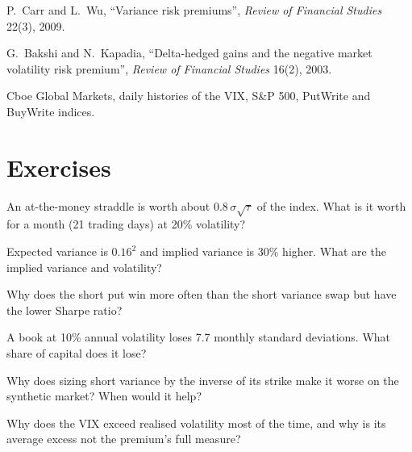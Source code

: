 \begin{omsources}
\item P.~Carr and L.~Wu, ``Variance risk premiums'', \emph{Review of Financial Studies} 22(3), 2009.
\item G.~Bakshi and N.~Kapadia, ``Delta-hedged gains and the negative market volatility risk premium'', \emph{Review of Financial Studies} 16(2), 2003.
\item Cboe Global Markets, daily histories of the VIX, S\&P 500, PutWrite and BuyWrite indices.
\end{omsources}

\section{Exercises}

\begin{exercise}[$\star$]\label{exo:s2:harvesting-the-variance-risk-premium:1}
An at-the-money straddle is worth about $0.8\,\sigma\sqrt{\tau}$ of the index. What is it worth for a month (21 trading days) at 20\% volatility?
\end{exercise}

\begin{exercise}[$\star$]\label{exo:s2:harvesting-the-variance-risk-premium:2}
Expected variance is $0.16^2$ and implied variance is 30\% higher. What are the implied variance and volatility?
\end{exercise}

\begin{exercise}[$\star$]\label{exo:s2:harvesting-the-variance-risk-premium:3}
Why does the short put win more often than the short variance swap but have the lower Sharpe ratio?
\end{exercise}

\begin{exercise}[$\star\star$]\label{exo:s2:harvesting-the-variance-risk-premium:4}
A book at 10\% annual volatility loses 7.7 monthly standard deviations. What share of capital does it lose?
\end{exercise}

\begin{exercise}[$\star\star$]\label{exo:s2:harvesting-the-variance-risk-premium:5}
Why does sizing short variance by the inverse of its strike make it worse on the synthetic market? When would it help?
\end{exercise}

\begin{exercise}[$\star\star$]\label{exo:s2:harvesting-the-variance-risk-premium:6}
Why does the VIX exceed realised volatility most of the time, and why is its average excess not the premium's full measure?
\end{exercise}

